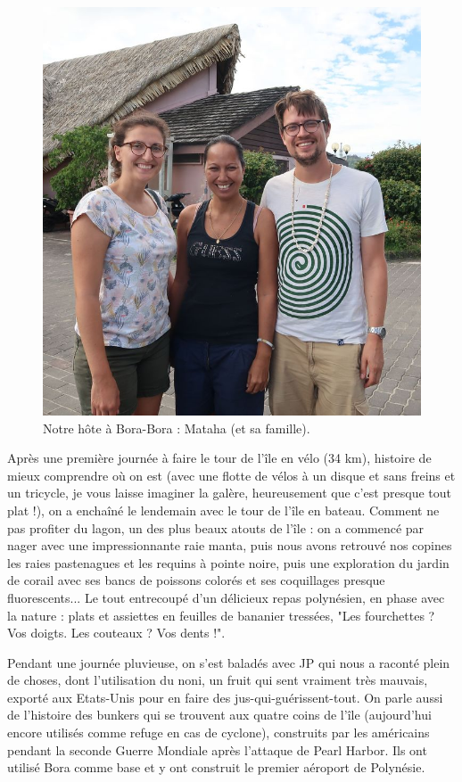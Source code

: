 \begin{figure}
\centering
\includegraphics{images/20180820_mataha.JPG}
\caption{Notre hôte à Bora-Bora : Mataha (et sa famille).}
\end{figure}

Après une première journée à faire le tour de l'île en vélo (34 km),
histoire de mieux comprendre où on est (avec une flotte de vélos à un
disque et sans freins et un tricycle, je vous laisse imaginer la galère,
heureusement que c'est presque tout plat !), on a enchaîné le lendemain
avec le tour de l'île en bateau. Comment ne pas profiter du lagon, un
des plus beaux atouts de l'île : on a commencé par nager avec une
impressionnante raie manta, puis nous avons retrouvé nos copines les
raies pastenagues et les requins à pointe noire, puis une exploration du
jardin de corail avec ses bancs de poissons colorés et ses coquillages
presque fluorescents... Le tout entrecoupé d'un délicieux repas
polynésien, en phase avec la nature : plats et assiettes en feuilles de
bananier tressées, "Les fourchettes ? Vos doigts. Les couteaux ? Vos
dents !".

Pendant une journée pluvieuse, on s'est baladés avec JP qui nous a
raconté plein de choses, dont l'utilisation du noni, un fruit qui sent
vraiment très mauvais, exporté aux Etats-Unis pour en faire des
jus-qui-guérissent-tout. On parle aussi de l'histoire des bunkers qui se
trouvent aux quatre coins de l'île (aujourd'hui encore utilisés comme
refuge en cas de cyclone), construits par les américains pendant la
seconde Guerre Mondiale après l'attaque de Pearl Harbor. Ils ont utilisé
Bora comme base et y ont construit le premier aéroport de Polynésie.

